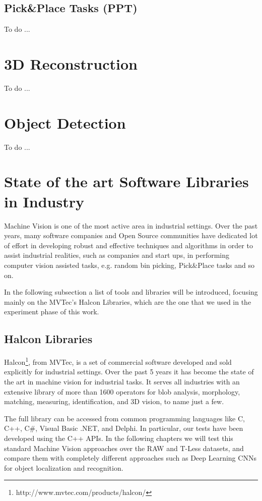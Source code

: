 \subsection{Pick\&Place Tasks (PPT)}\label{subsec:pickandplace}
To do ...

\section{3D Reconstruction}\label{sec:3dreconstruction}
To do ...

\section{Object Detection}\label{sec:objectdetection}
To do ...

\section{State of the art Software Libraries in Industry}\label{sec:industrylibraries}
Machine Vision is one of the most active area in industrial settings. Over the past years, many software companies and Open Source communities have dedicated lot of effort in developing robust and effective techniques and algorithms in order to assist industrial realities, such as companies and start ups, in performing computer vision assisted tasks, e.g. random bin picking, Pick\&Place tasks and so on.

In the following subsection a list of tools and libraries will be introduced, focusing mainly on the MVTec's Halcon Libraries, which are the one that we used in the experiment phase of this work. 

\subsection{Halcon Libraries}\label{subsec:halconlibs}
Halcon\footnote{http://www.mvtec.com/products/halcon/}, from MVTec, is a set of commercial software developed and sold explicitly for industrial settings. Over the past 5 years it has become the state of the art in machine vision for industrial tasks. It serves all industries with an extensive library of more than 1600 operators for blob analysis, morphology, matching, measuring, identification, and 3D vision, to name just a few.

The full library can be accessed from common programming languages like C, C++, C\#, Visual Basic .NET, and Delphi. In particular, our tests have been developed using the C++ APIs. In the following chapters we will test this standard Machine Vision approaches over the RAW and T-Less datasets, and compare them with completely different approaches such as Deep Learning CNNs for object localization and recognition.

